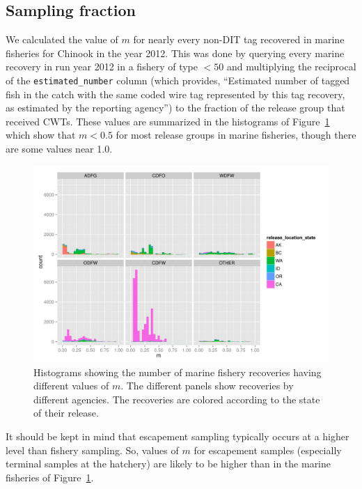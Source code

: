 \documentclass[11pt]{article}
\begin{document}
\subsection{Sampling fraction}
We calculated the value of $m$ for nearly every non-DIT tag recovered in marine fisheries
for Chinook in the year 2012.  This was done by querying every marine recovery in
run year 2012 in a fishery of type $<50$  and multiplying the reciprocal of the {\tt estimated\_number} column
(which provides, ``Estimated number of tagged fish in the catch with the same coded wire
tag represented by this tag recovery, as estimated by the reporting agency'') to the
fraction of the release group that received CWTs. These values are summarized in the 
histograms of Figure~\ref{fig:mhists} which show that $m < 0.5$ for most release groups
in marine fisheries, though there are some values near 1.0.
\begin{figure}
\centering
\includegraphics[width = \textwidth]{./images/m_histo_chinook.pdf}
\caption{Histograms showing the number of marine fishery recoveries having different values of $m$.  The different
panels show recoveries by different agencies.  The recoveries are colored according to the 
state of their release.}
\label{fig:mhists}
\end{figure}
It should be kept in mind that escapement sampling typically occurs at a higher level than fishery sampling. So,
values of $m$ for escapement samples (especially terminal samples at the hatchery) are likely to be higher than
in the marine fisheries of Figure~\ref{fig:mhists}.
  
\end{document}
